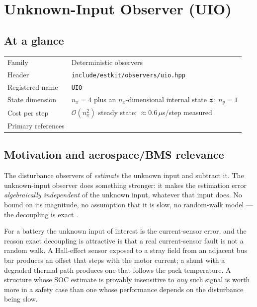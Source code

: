 \chapter{Unknown-Input Observer (UIO)}
\label{ch:uio}

\section*{At a glance}
\begin{tabular}{@{}l>{\raggedright\arraybackslash}p{}@{}}
Family & Deterministic observers \\
Header & \texttt{include/estkit/observers/uio.hpp} \\
Registered name & \texttt{UIO} \\
State dimension & $n_x = 4$ plus an $n_x$-dimensional internal state $\bm{z}$; $n_y = 1$ \\
Cost per step & $\mathcal{O}(n_x^2)$ steady state; $\approx 0.6\,\mu$s/step measured \\
Primary references & \cite{chen1996uio,chenpatton1999,darouach1994uio,houmuller1992uio,zhao2017observability} \\
\end{tabular}

\section{Motivation and aerospace/BMS relevance}
The disturbance observers of  \emph{estimate} the unknown input and subtract
it.  The unknown-input observer does something stronger: it makes the estimation error
\emph{algebraically independent} of the unknown input, whatever that input does.  No bound on its
magnitude, no assumption that it is slow, no random-walk model --- the decoupling is exact
\cite{chen1996uio,chenpatton1999}.

For a battery the unknown input of interest is the current-sensor error, and the reason exact
decoupling is attractive is that a real current-sensor fault is not a random walk.  A Hall-effect
sensor exposed to a stray field from an adjacent bus bar produces an offset that steps with the
motor current; a shunt with a degraded thermal path produces one that follows the pack
temperature.  A structure whose SOC estimate is provably insensitive to \emph{any} such signal is
worth more in a safety case than one whose performance depends on the disturbance being slow.

